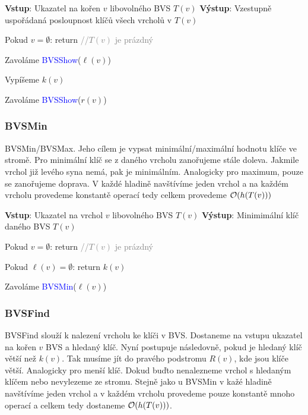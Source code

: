 \noindent \textbf{Vstup}: Ukazatel na kořen $v$ libovolného BVS $T(v)$ \newline
\noindent \textbf{Výstup}: Vzestupně uspořádaná posloupnost klíčů všech vrcholů v $T(v)$ \newline
{}
\begin{pseudocode}
  \item Pokud $v = \emptyset$: return \textcolor{gray}{//$T(v)$ je prázdný}
  \item Zavoláme \textcolor{blue}{BVSShow}($\ell(v)$)
  \item Vypíšeme $k(v)$
  \item Zavoláme \textcolor{blue}{BVSShow}($r(v)$)
\end{pseudocode} \bigskip

\subsubsection{BVSMin}

\noindent BVSMin/BVSMax. Jeho cílem je vypsat minimální/maximální hodnotu klíče ve stromě. Pro minimální klíč se z daného vrcholu zanořujeme stále doleva. Jakmile vrchol již levého syna nemá, pak je minimálním. Analogicky pro maximum, pouze se zanořujeme doprava. V každé hladině navštívíme jeden vrchol a na každém vrcholu provedeme konstantě operací tedy celkem provedeme $\mathcal{O}(h(T(v)))$\bigskip

\noindent \textbf{Vstup}: Ukazatel na vrchol $v$ libovolného BVS $T(v)$ \newline
\noindent \textbf{Výstup}: Minimimální klíč daného BVS $T(v)$ \newline
{}
\begin{pseudocode}
  \item Pokud $v = \emptyset$: return \textcolor{gray}{//$T(v)$ je prázdný}
  \item Pokud $\ell(v) = \emptyset$: return $k(v)$
  \item Zavoláme \textcolor{blue}{BVSMin}($\ell(v)$)
\end{pseudocode} \bigskip

\subsubsection{BVSFind}

\noindent BVSFind slouží k nalezení vrcholu ke klíči v BVS. Dostaneme na vstupu ukazatel na kořen $v$ BVS a hledaný klíč. Nyní postupuje následovně, pokud je hledaný klíč větší než $k(v)$. Tak musíme jít do pravého podstromu $R(v)$, kde jsou klíče větší. Analogicky pro menší klíč. Dokud buďto nenalezneme vrchol s hledaným klíčem nebo nevylezeme ze stromu. Stejně jako u BVSMin v kažé hladině navštívíme jeden vrchol a v každém vrcholu provedeme pouze konstantě mnoho operací a celkem tedy dostaneme $\mathcal{O}(h(T(v)))$. \bigskip

